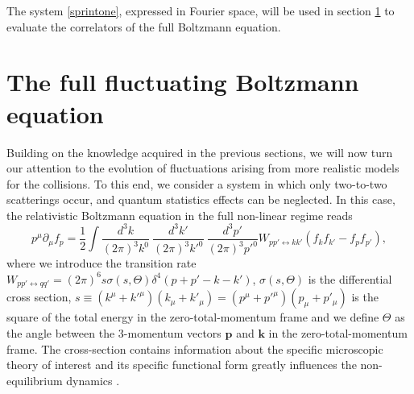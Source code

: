 \documentclass[aps,prd,preprint,nofootinbib,amsmath,amssymb,showpacs,longbibliography,singlecolumn,superscriptaddress,10pt]{revtex4-1}
\theoremstyle{plain}
\theoremstyle{definition}
\begin{document}
The system \eqref{sprintone}, expressed in Fourier space, will be used in section \ref{The full boltz} to evaluate the correlators of the full Boltzmann equation. 





\section{The full fluctuating Boltzmann equation}\label{The full boltz}



Building on the knowledge acquired in the previous sections, we will now turn our attention to the evolution of fluctuations arising from more realistic models for the collisions. To this end, we consider a system in which only two-to-two scatterings occur, and quantum statistics effects can be neglected. In this case, the relativistic Boltzmann equation in the full non-linear regime reads
%
\begin{equation}
\label{eq:Boltzmann}
p^{\mu} \partial_{\mu} f_{p}  
=
\frac{1}{2}
\int\frac{d^{3}k}{(2 \pi)^{3} k^{0}} \ \frac{d^{3}k'}{(2 \pi)^{3} k'^{0}} \ \frac{d^{3}p'}{(2 \pi)^{3} p'^{0}} W_{pp' \leftrightarrow kk'} (f_{k}f_{k'}  -  f_{p}f_{p'}), 
\end{equation}
%
where we introduce the transition rate  $W_{pp' \leftrightarrow qq'}  = (2\pi)^{6} s \sigma(s,\Theta) \delta^{4}(p+p'-k-k')$, $\sigma(s,\Theta)$ is the differential cross section, $s \equiv (k^{\mu}+k'^{\mu})(k_{\mu}+k'_{\mu}) = (p^{\mu}+p'^{\mu})(p_{\mu}+p'_{\mu})$ is the square of the total energy in the zero-total-momentum frame and we define $\Theta$ as the angle between the 3-momentum vectors $\mathbf{p}$ and $\mathbf{k}$ in the zero-total-momentum frame. The cross-section contains information about the specific microscopic theory of interest and its specific functional form greatly influences the non-equilibrium dynamics \cite{DeGroot:1980dk,cercignani:02relativistic,Gavassino:2024rck,Rocha:2024cge}. 
\end{document}
